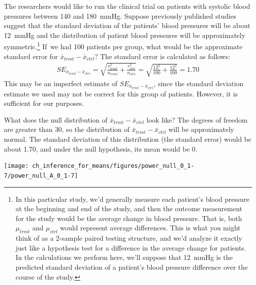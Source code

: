 \begin{examplewrap}
\begin{nexample}{The researchers would like to run the clinical trial on patients with systolic blood pressures between 140 and 180~mmHg. Suppose previously published studies suggest that the standard deviation of the patients' blood pressures will be about 12~mmHg and the distribution of patient blood pressures will be approximately symmetric.\footnote{In this particular study, we'd generally measure each patient's blood pressure at the beginning and end of the study, and then the outcome measurement for the study would be the average change in blood pressure. That is, both $\mu_{trmt}$ and $\mu_{ctrl}$ would represent average differences. This is what you might think of as a 2-sample paired testing structure, and we'd analyze it exactly just like a hypothesis test for a difference in the average change for patients. In the calculations we perform here, we'll suppose that 12~mmHg is the predicted standard deviation of a patient's blood pressure difference over the course of the study.} If~we had 100 patients per group, what would be the approximate standard error for $\bar{x}_{trmt} - \bar{x}_{ctrl}$?}
The standard error is calculated as follows:
\begin{align*}
SE_{\bar{x}_{trmt} - \bar{x}_{ctrl}}
  = \sqrt{\frac{s_{trmt}^2}{n_{trmt}} + \frac{s_{ctrl}^2}{n_{ctrl}}}
  = \sqrt{\frac{12^2}{100} + \frac{12^2}{100}}
  = 1.70
\end{align*}
This may be an imperfect estimate of $SE_{\bar{x}_{trmt} - \bar{x}_{ctrl}}$, since the standard deviation estimate we used may not be correct for this group of patients. However, it is sufficient for our purposes.
\end{nexample}
\end{examplewrap}

\begin{examplewrap}
\begin{nexample}{What does the null distribution of $\bar{x}_{trmt} - \bar{x}_{ctrl}$ look like?}
The degrees of freedom are greater than 30, so the distribution of $\bar{x}_{trmt} - \bar{x}_{ctrl}$ will be approximately normal. The standard deviation of this distribution (the standard error) would be about 1.70, and under the null hypothesis, its mean would be 0.
\begin{center}
\texttt{[image: ch\_inference\_for\_means/figures/power\_null\_0\_1-7/power\_null\_A\_0\_1-7]}
\end{center}
\end{nexample}
\end{examplewrap}


